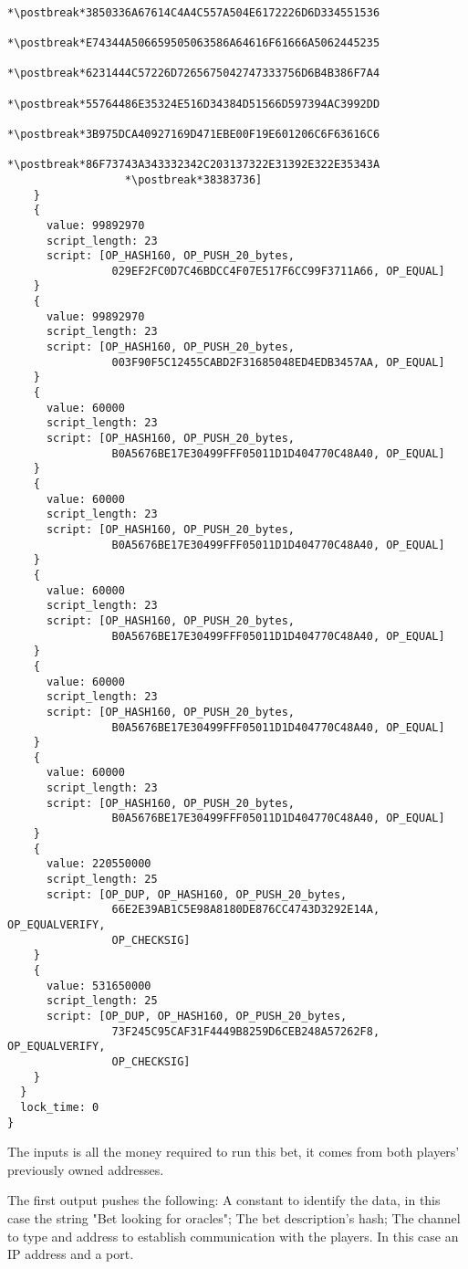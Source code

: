 \begin{lstlisting}
                  *\postbreak*3850336A67614C4A4C557A504E6172226D6D334551536
                  *\postbreak*E74344A506659505063586A64616F61666A5062445235
                  *\postbreak*6231444C57226D7265675042747333756D6B4B386F7A4
                  *\postbreak*55764486E35324E516D34384D51566D597394AC3992DD
                  *\postbreak*3B975DCA40927169D471EBE00F19E601206C6F63616C6
                  *\postbreak*86F73743A343332342C203137322E31392E322E35343A
                  *\postbreak*38383736]
    }
    {
      value: 99892970
      script_length: 23
      script: [OP_HASH160, OP_PUSH_20_bytes,
                029EF2FC0D7C46BDCC4F07E517F6CC99F3711A66, OP_EQUAL]
    }
    {
      value: 99892970
      script_length: 23
      script: [OP_HASH160, OP_PUSH_20_bytes,
                003F90F5C12455CABD2F31685048ED4EDB3457AA, OP_EQUAL]
    }
    {
      value: 60000
      script_length: 23
      script: [OP_HASH160, OP_PUSH_20_bytes,
                B0A5676BE17E30499FFF05011D1D404770C48A40, OP_EQUAL]
    }
    {
      value: 60000
      script_length: 23
      script: [OP_HASH160, OP_PUSH_20_bytes,
                B0A5676BE17E30499FFF05011D1D404770C48A40, OP_EQUAL]
    }
    {
      value: 60000
      script_length: 23
      script: [OP_HASH160, OP_PUSH_20_bytes,
                B0A5676BE17E30499FFF05011D1D404770C48A40, OP_EQUAL]
    }
    {
      value: 60000
      script_length: 23
      script: [OP_HASH160, OP_PUSH_20_bytes,
                B0A5676BE17E30499FFF05011D1D404770C48A40, OP_EQUAL]
    }
    {
      value: 60000
      script_length: 23
      script: [OP_HASH160, OP_PUSH_20_bytes,
                B0A5676BE17E30499FFF05011D1D404770C48A40, OP_EQUAL]
    }
    {
      value: 220550000
      script_length: 25
      script: [OP_DUP, OP_HASH160, OP_PUSH_20_bytes,
                66E2E39AB1C5E98A8180DE876CC4743D3292E14A, OP_EQUALVERIFY,
                OP_CHECKSIG]
    }
    {
      value: 531650000
      script_length: 25
      script: [OP_DUP, OP_HASH160, OP_PUSH_20_bytes,
                73F245C95CAF31F4449B8259D6CEB248A57262F8, OP_EQUALVERIFY,
                OP_CHECKSIG]
    }
  }
  lock_time: 0
}
\end{lstlisting}

The inputs is all the money required to run this bet, it comes from both
  players' previously owned addresses.

The first output pushes the following: A constant to identify the data, in this
  case the string "Bet looking for oracles"; The bet description's hash; The
  channel to type and address to establish communication with the players. In
  this case an IP address and a port.

